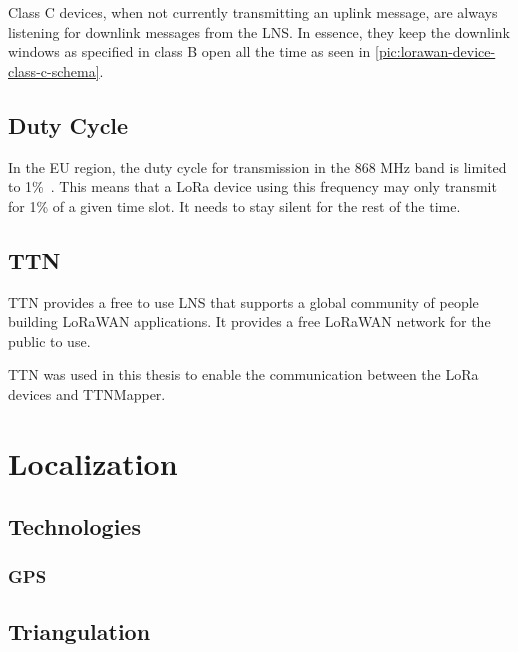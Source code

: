 Class C devices, when not currently transmitting an uplink message, are always listening for downlink messages from the \ac{LNS}.
In essence, they keep the downlink windows as specified in class B open all the time as seen in \cref{pic:lorawan-device-class-c-schema}.

\subsection{Duty Cycle}


In the \ac{EU} region, the duty cycle for transmission in the 868 MHz band is limited to 1\%~\cite{etsi_etsi_2012}.
This means that a \ac{LoRa} device using this frequency may only transmit for 1\% of a given time slot.
It needs to stay silent for the rest of the time.

\subsection{\acf{TTN}}

\ac{TTN} provides a free to use \ac{LNS} that supports a global community of people building \ac{LoRaWAN} applications.
It provides a free \ac{LoRaWAN} network for the public to use.

\ac{TTN} was used in this thesis to enable the communication between the \ac{LoRa} devices and TTNMapper.


\section{Localization}

\subsection{Technologies}

\subsubsection{\ac{GPS}}


\subsection{Triangulation}


